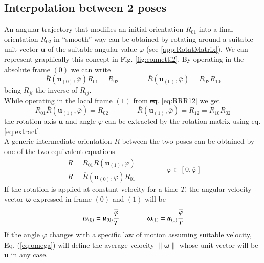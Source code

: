 \documentclass[preprint, 12pt]{elsarticle}
\def\vect#1{{\boldsymbol{#1}}}
\newcommand{\norm}[1]{\left\lVert#1\right\rVert}
\providecommand{\DIFadd}[1]{{\protect\color{blue}\uwave{#1}}} %
\providecommand{\DIFdel}[1]{{\protect\color{red}\sout{#1}}}                      %
\providecommand{\DIFaddbegin}{} %
\providecommand{\DIFaddend}{} %
\providecommand{\DIFdelbegin}{} %
\providecommand{\DIFdelend}{} %
\begin{document}
\subsection{Interpolation between 2 poses}
\label{subsec:connetti2}
An angular trajectory that modifies an initial orientation $R_{01}$ into a final orientation $R_{02}$ in ``smooth'' way can be obtained by rotating around a suitable unit vector $\vect{u}$ of the suitable angular value $\overline{\varphi}$ (see \ref{app:RotatMatrix}). We can represent graphically this concept in Fig. \ref{fig:connetti2}. By operating in the absolute frame $(0)$ we can write
\begin{equation}
\overline{R}(\vect{u}_{(0)},\overline{\varphi})R_{01}=R_{02}
\qquad\qquad
    \overline{R}(\vect{u}_{(0)},\overline{\varphi}) =R_{02}R_{10}
    \label{eq:rotat_u0}
\end{equation}
being $R_{ji}$ the inverse of $R_{ij}$.\\
While operating in the local frame $(1)$ from \DIFdelbegin \DIFdel{eq}\DIFdelend \DIFaddbegin \DIFadd{Eq}\DIFaddend . \ref{eq:RRR12} we get
\begin{equation}
R_{01}\overline{R}(\vect{u}_{(1)},\overline{\varphi})=R_{02}
\qquad\qquad
    \overline{R}(\vect{u}_{(1)},\overline{\varphi})=R_{12} =R_{10}R_{02}
    \label{eq:rotat_u1}
\end{equation}
the rotation axis $\vect{u}$ and angle $\overline{\varphi}$ can be extracted by the rotation matrix using  eq. \ref{eq:extract}.\\ %
A generic intermediate orientation $R$ between the two poses can be obtained by one of the two equivalent equations
\begin{equation}
    \begin{array}{l}
        R = R_{01} \overline{R}(\vect{u}_{(1)},\varphi)\\[2ex]
        R = \overline{R}(\vect{u}_{(0)},\varphi) R_{01}
    \end{array}
    \qquad\qquad
    \varphi \in \left[ 0, \overline{\varphi} \right]
    \label{eq:rotat_int}
\end{equation}
If the rotation is applied at constant velocity for a time $T$, the angular velocity vector $\vect{\omega}$ expressed in frame $(0)$ and $(1)$ will be
\begin{equation}
    \vect{\omega}_{(0)} = \vect{u}_{(0)} \cfrac{\overline{\varphi}}{T}
    \qquad\qquad
    \vect{\omega}_{(1)} = \vect{u}_{(1)} \cfrac{\overline{\varphi}}{T}
    \label{eq:omega}
\end{equation}
If the angle $\varphi$ changes with a specific law of motion assuming suitable velocity, Eq. (\ref{eq:omega}) will define the average velocity $\norm{\vect{\omega}}$ whose unit vector will be $\vect{u}$ in any case. 
\end{document}
